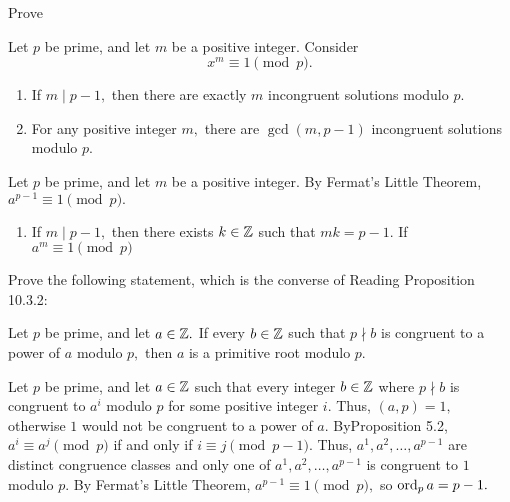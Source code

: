 \documentclass[handout]{ximera}
\begin{document}
\begin{br} Prove
    \begin{prop*}[Proposition 10.2.2]\label{read-prop:roots-unity}
        Let $p$ be prime, and let $m$ be a positive integer. Consider \[x^m\equiv 1\pmod{p}.\]
        
        \begin{enumerate}
            \item If $m\mid p-1,$ then there are exactly $m$ incongruent solutions modulo $p.$
            \item For any positive integer $m,$ there are $\gcd(m,p-1)$ incongruent solutions modulo $p.$
        \end{enumerate}
    \end{prop*}

    \begin{solution}
        Let $p$ be prime, and let $m$ be a positive integer. By Fermat's Little Theorem, $a^{p-1}\equiv 1\pmod{p}.$

        \begin{enumerate}
            \item If $m\mid p-1,$ then there exists $k\in\mathbb Z$ such that $mk=p-1.$ If $a^m\equiv 1\pmod{p}$
        \end{enumerate}
    \end{solution}
    \pdfOnly{\ifhandout
        \vfill
        \else\fi}
\end{br}

\pdfOnly{\ifhandout
        \pagebreak
        \else\fi}

\begin{br}
    Prove the following statement, which is the converse of Reading Proposition 10.3.2:

    Let $p$ be prime, and let $a\in\mathbb Z.$ If every $b\in\mathbb Z$ such that $p\nmid b$ is congruent to a power of $a$ modulo $p,$ then ${a}$ is a primitive root modulo $p$.
    
    \begin{solution}
        Let $p$ be prime, and let $a\in\mathbb Z$ such that every integer $b\in\mathbb Z$ where $p\nmid b$ is congruent to $a^i$ modulo $p$ for some positive integer $i$. Thus, $(a,p)=1,$ otherwise $1$ would not be congruent to a power of $a$. ByProposition 5.2, $a^i\equiv a^j\pmod{p}$ if and only if $i\equiv j\pmod{p-1}.$ Thus, $a^1,a^2,\dots,a^{p-1}$ are distinct congruence classes and only one of $a^1,a^2,\dots,a^{p-1}$ is congruent to $1$ modulo $p.$ By Fermat's Little Theorem, $a^{p-1}\equiv1\pmod{p},$ so $\operatorname{ord}_p a=p-1.$
    \end{solution}
    \pdfOnly{\ifhandout
        \vfill
        \else\fi}
\end{br}
\end{document}
